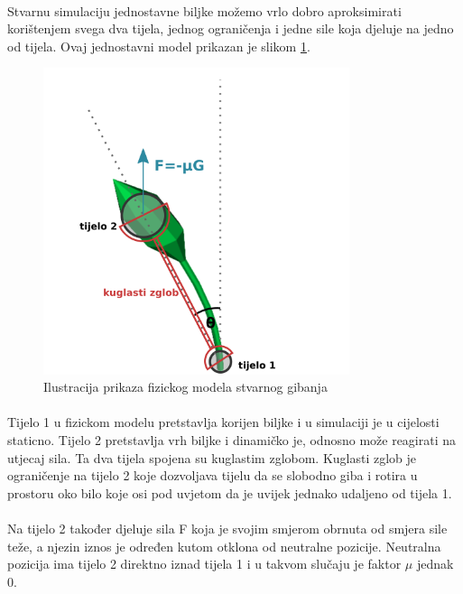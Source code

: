\documentclass[times, utf8, diplomski]{fer}
\begin{document}
\paragraph{}
Stvarnu simulaciju jednostavne biljke možemo vrlo dobro aproksimirati korištenjem svega dva 
tijela, jednog ograničenja i jedne sile koja djeluje na jedno od tijela. Ovaj jednostavni model prikazan je slikom \ref{fig:32-1}.

\begin{figure}[h]
	\centering
	\includegraphics[width=0.8\textwidth]{img/32-1}
	\caption{Ilustracija prikaza fizickog modela stvarnog gibanja}
	\label{fig:32-1}
\end{figure}

\paragraph{}
Tijelo 1 u fizickom modelu pretstavlja korijen biljke i u simulaciji je u cijelosti 
staticno. Tijelo 2 pretstavlja vrh biljke i dinamičko je, odnosno može reagirati na utjecaj
sila. Ta dva tijela spojena su kuglastim zglobom. Kuglasti zglob je ograničenje na tijelo 2 
koje dozvoljava tijelu da se slobodno giba i rotira u prostoru oko bilo koje osi pod uvjetom 
da je uvijek jednako udaljeno od tijela 1.

\paragraph{}
Na tijelo 2 također djeluje sila F koja je svojim smjerom obrnuta od smjera sile teže, a 
njezin iznos je određen kutom otklona od neutralne pozicije. Neutralna pozicija ima tijelo 2 
direktno iznad tijela 1 i u takvom slučaju je faktor $\mu$ jednak 0.
\end{document}
